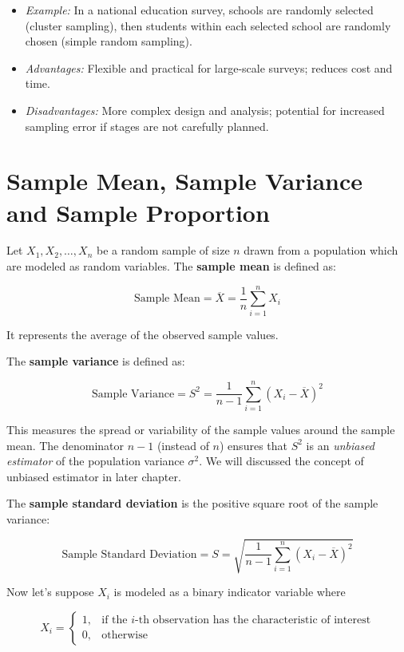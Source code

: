 \documentclass[twoside]{book}
\begin{document}
\begin{itemize}
\item \textit{Example:} In a national education survey, schools are randomly selected (cluster sampling), then students within each selected school are randomly chosen (simple random sampling).

\item \textit{Advantages:} Flexible and practical for large-scale surveys; reduces cost and time.

\item \textit{Disadvantages:} More complex design and analysis; potential for increased sampling error if stages are not carefully planned.
\end{itemize}

\section{Sample Mean, Sample Variance and Sample Proportion}

Let \( X_1, X_2, \dots, X_n \) be a random sample of size \( n \) drawn from a population which are modeled as random variables. The \textbf{sample mean} is defined as:
\begin{textbox}
     \[
\text{Sample Mean} = \overline{X} = \frac{1}{n} \sum_{i=1}^{n} X_i
\]
\end{textbox}
It represents the average of the observed sample values.

The \textbf{sample variance} is defined as:
\begin{textbox}
\[
\text{Sample Variance} = S^2 = \frac{1}{n - 1} \sum_{i=1}^{n} (X_i - \overline{X})^2
\]
\end{textbox}
This measures the spread or variability of the sample values around the sample mean. The denominator \( n - 1 \) (instead of \( n \)) ensures that \( S^2 \) is an \emph{unbiased estimator} of the population variance \( \sigma^2 \). We will discussed the concept of unbiased estimator in later chapter.

The \textbf{sample standard deviation} is the positive square root of the sample variance:
\begin{textbox}
\[
\text{Sample Standard Deviation} = S = \sqrt{\frac{1}{n - 1} \sum_{i=1}^{n} (X_i - \overline{X})^2}
\]
\end{textbox}

Now let's suppose \( X_i \) is modeled as a binary indicator variable where

\[
X_i = \begin{cases}
1, & \text{if the } i\text{-th observation has the characteristic of interest} \\
0, & \text{otherwise}
\end{cases}
\]
\end{document}
